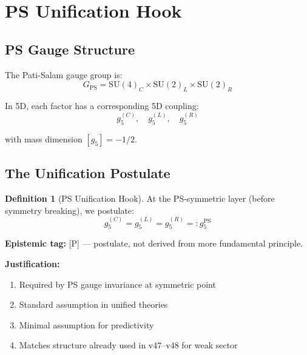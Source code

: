 \documentclass[11pt,a4paper]{article}
\theoremstyle{definition}
\newtheorem{definition}{Definition}[section]
\begin{document}
\section{PS Unification Hook}
\label{sec:unification-hook}

\subsection{PS Gauge Structure}
\label{subsec:ps-structure}

The Pati-Salam gauge group is:
\begin{equation}
\label{eq:ps-group}
G_{\text{PS}} = \text{SU}(4)_C \times \text{SU}(2)_L \times \text{SU}(2)_R
\end{equation}

In 5D, each factor has a corresponding 5D coupling:
\begin{equation}
\label{eq:5d-couplings}
g_5^{(C)}, \quad g_5^{(L)}, \quad g_5^{(R)}
\end{equation}

with mass dimension $[g_5] = -1/2$.

\subsection{The Unification Postulate}
\label{subsec:unification-postulate}

\begin{definition}[PS Unification Hook]
\label{def:unification-hook}
At the PS-symmetric layer (before symmetry breaking), we postulate:
\begin{equation}
\label{eq:unification-hook}
\boxed{g_5^{(C)} = g_5^{(L)} = g_5^{(R)} =: g_5^{\text{PS}}}
\end{equation}
\end{definition}

\textbf{Epistemic tag:} [P] --- postulate, not derived from more fundamental principle.

\textbf{Justification:}
\begin{enumerate}
  \item Required by PS gauge invariance at symmetric point
  \item Standard assumption in unified theories
  \item Minimal assumption for predictivity
  \item Matches structure already used in v47--v48 for weak sector
\end{enumerate}
\end{document}
